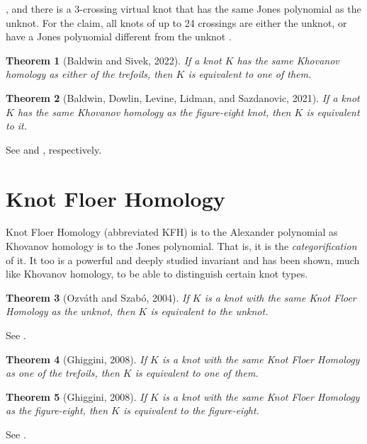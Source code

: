\documentclass{article}
\theoremstyle{plain}
\newtheorem{theorem}{Theorem}
\begin{document}
        \cite{Thistlethwaite2001LINKSWT}, and there is a 3-crossing virtual
        knot that has the same Jones polynomial as the unknot. For the claim,
        all knots of up to 24 crossings are either the unknot, or have a
        Jones polynomial different from the unknot
        \cite{VerificationUnknotJonesConjUpTo24}.
        \begin{theorem}[Baldwin and Sivek, 2022]
            If a knot $K$ has the same Khovanov homology as either of the
            trefoils, then $K$ is equivalent to one of them.
        \end{theorem}
        \begin{theorem}[Baldwin, Dowlin, Levine, Lidman, and Sazdanovic, 2021]
            If a knot $K$ has the same Khovanov homology as the figure-eight
            knot, then $K$ is equivalent to it.
        \end{theorem}
        See \cite{BaldwinSivekKhovanovTrefoils} and
        \cite{BaldwinDowlinKhovanovFigureEight}, respectively.
    \section{Knot Floer Homology}
        Knot Floer Homology (abbreviated KFH) is to the Alexander polynomial as
        Khovanov homology is to the Jones polynomial. That is, it is the
        \textit{categorification} of it. It too is a powerful and deeply studied
        invariant and has been shown, much like Khovanov homology, to be able to
        distinguish certain knot types.
        \begin{theorem}[Ozv\'{a}th and Szab\'{o}, 2004]
            If $K$ is a knot with the same Knot Floer Homology as the unknot,
            then $K$ is equivalent to the unknot.
        \end{theorem}
        See \cite{Ozsvath04holomorphicdisks}.
        \begin{theorem}[Ghiggini, 2008]
            If $K$ is a knot with the same Knot Floer Homology as one of the
            trefoils, then $K$ is equivalent to one of them.
        \end{theorem}
        \begin{theorem}[Ghiggini, 2008]
            If $K$ is a knot with the same Knot Floer Homology as the
            figure-eight, then $K$ is equivalent to the figure-eight.
        \end{theorem}
        See \cite{Ghiggini08knotfloer}.
\end{document}
